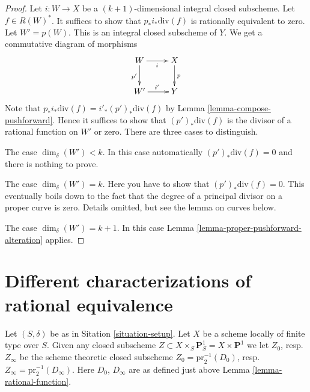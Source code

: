 \begin{proof}
Let $i : W \to X$ be a $(k + 1)$-dimensional integral closed subscheme.
Let $f \in R(W)^*$. It suffices to show that
$p_*i_*\text{div}(f)$ is rationally equivalent to zero.
Let $W' = p(W)$. This is an integral closed subscheme of $Y$.
We get a commutative diagram of morphisms
$$
\xymatrix{
W \ar[r]_i \ar[d]_{p'} & X \ar[d]^p \\
W' \ar[r]^{i'} & Y
}
$$
Note that $p_*i_*\text{div}(f) = i'_*(p')_*\text{div}(f)$ by
Lemma \ref{lemma-compose-pushforward}. Hence
it suffices to show that $(p')_*\text{div}(f)$
is the divisor of a rational function on $W'$ or zero.
There are three cases to distinguish.

\medskip\noindent
The case $\dim_\delta(W') < k$. In this case automatically
$(p')_*\text{div}(f) = 0$ and there is nothing to prove.

\medskip\noindent
The case $\dim_\delta(W') = k$. Here you have to show that
$(p')_*\text{div}(f) = 0$. This eventually boils down to
the fact that the degree of a principal divisor on a proper
curve is zero. Details omitted, but see the lemma on curves below.

\medskip\noindent
The case $\dim_\delta(W') = k + 1$. In this case
Lemma \ref{lemma-proper-pushforward-alteration} applies.
\end{proof}















\section{Different characterizations of rational equivalence}
\label{section-different-rational-equivalence}

\noindent
Let $(S, \delta)$ be as in Sitation \ref{situation-setup}.
Let $X$ be a scheme locally of finite type over $S$.
Given any closed subscheme
$Z \subset X \times_S \mathbf{P}^1_S = X \times \mathbf{P}^1$
we let $Z_0$, resp.\ $Z_\infty$ be the scheme theoretic closed 
subscheme $Z_0 = \text{pr}_2^{-1}(D_0)$,
resp.\ $Z_\infty = \text{pr}_2^{-1}(D_\infty)$.
Here $D_0$, $D_\infty$ are as defined just above
Lemma \ref{lemma-rational-function}.

